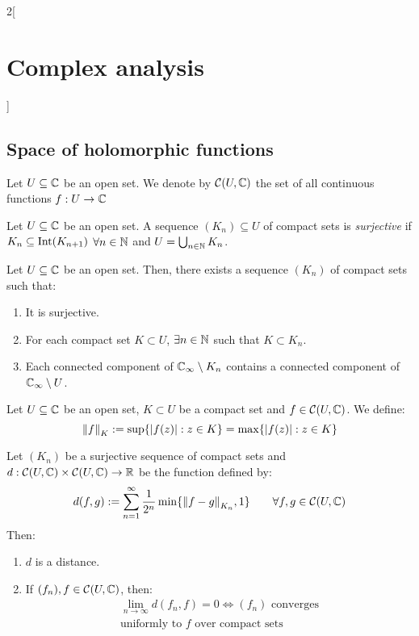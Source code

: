 \documentclass[../../../main.tex]{subfiles}
\begin{document}
\begin{multicols}{2}[\section{Complex analysis}]
  \subsection{Space of holomorphic functions}
  \begin{definition}
    Let $U\subseteq\mathbb{C}$ be an open set. We denote by $\mathcal{C}(U,\mathbb{C})$ the set of all continuous functions $f:U\rightarrow\mathbb{C}$
  \end{definition}
  \begin{definition}
    Let $U\subseteq\mathbb{C}$ be an open set. A sequence $(K_n)\subseteq U$ of compact sets is \emph{surjective} if $K_n\subseteq \operatorname{Int}(K_{n+1})$ $\forall n\in\mathbb{N}$ and $U=\bigcup_{n\in\mathbb{N}}K_n$.
  \end{definition}
  \begin{proposition}
    Let $U\subseteq\mathbb{C}$ be an open set. Then, there exists a sequence $(K_n)$ of compact sets such that:
    \begin{enumerate}
      \item It is surjective.
      \item For each compact set $K\subset U$, $\exists n\in\mathbb{N}$ such that $K\subset K_n$.
      \item Each connected component of $\mathbb{C}_\infty\setminus K_n$ contains a connected component of $\mathbb{C}_\infty\setminus U$.
    \end{enumerate}
  \end{proposition}
  \begin{definition}
    Let $U\subseteq\mathbb{C}$ be an open set, $K\subset U$ be a compact set and $f\in\mathcal{C}(U,\mathbb{C})$. We define: $${\|f\|}_K:=\sup\{\abs{f(z)}:z\in K\}=\max\{\abs{f(z)}:z\in K\}$$
  \end{definition}
  \begin{theorem}
    Let $(K_n)$ be a surjective sequence of compact sets and $d:\mathcal{C}(U,\mathbb{C})\times\mathcal{C}(U,\mathbb{C})\rightarrow\mathbb{R}$ be the function defined by:
    $$d(f,g):=\sum_{n=1}^\infty\frac{1}{2^n}\min\{{\|f-g\|}_{K_n},1\}\qquad\forall f,g\in\mathcal{C}(U,\mathbb{C})$$ Then:
    \begin{enumerate}
      \item $d$ is a distance.
      \item If $(f_n),f\in\mathcal{C}(U,\mathbb{C})$, then:
            \begin{multline*}
              \lim_{n\to\infty}d(f_n,f)= 0\iff (f_n)\text{ converges}\\ \text{uniformly to }f\text{ over compact sets}
            \end{multline*}

\end{enumerate}
\end{theorem}
\end{multicols}
\end{document}
